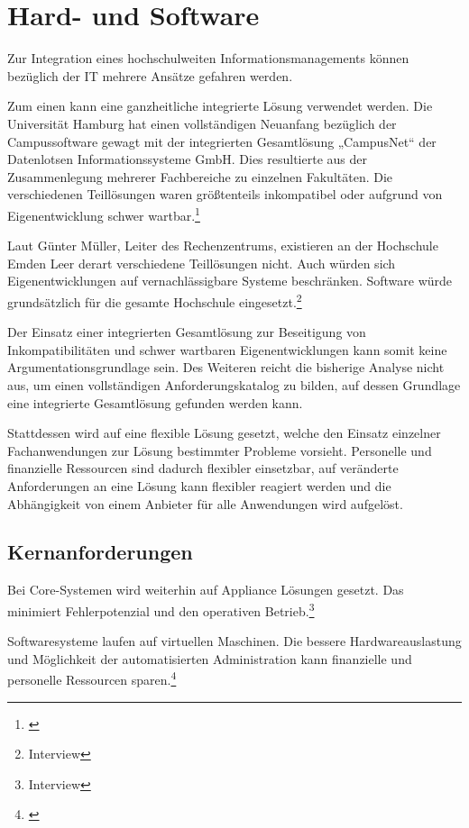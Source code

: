 \section{Hard- und Software}
Zur Integration eines hochschulweiten Informationsmanagements können bezüglich der IT mehrere Ansätze gefahren werden.

Zum einen kann eine ganzheitliche integrierte Lösung verwendet werden. Die Universität Hamburg hat einen vollständigen Neuanfang bezüglich der Campussoftware gewagt mit der integrierten Gesamtlösung „CampusNet“ der Datenlotsen Informationssysteme GmbH. Dies resultierte aus der Zusammenlegung mehrerer Fachbereiche zu einzelnen Fakultäten. Die verschiedenen Teillösungen waren größtenteils inkompatibel oder aufgrund von Eigenentwicklung schwer wartbar.\footnote{\cite{dini_webportale_2007}}

Laut Günter Müller, Leiter des Rechenzentrums, existieren an der Hochschule Emden Leer derart verschiedene Teillösungen nicht. Auch würden sich Eigenentwicklungen auf vernachlässigbare Systeme beschränken. Software würde grundsätzlich für die gesamte Hochschule eingesetzt.\footnote{Interview}

Der Einsatz einer integrierten Gesamtlösung zur Beseitigung von Inkompatibilitäten und schwer wartbaren Eigenentwicklungen kann somit keine Argumentationsgrundlage sein.
Des Weiteren reicht die bisherige Analyse nicht aus, um einen vollständigen Anforderungskatalog zu bilden, auf dessen Grundlage eine integrierte Gesamtlösung gefunden werden kann.

Stattdessen wird auf eine flexible Lösung gesetzt, welche den Einsatz einzelner Fachanwendungen zur Lösung bestimmter Probleme vorsieht. Personelle und finanzielle Ressourcen sind dadurch flexibler einsetzbar, auf veränderte Anforderungen an eine Lösung kann flexibler reagiert werden und die Abhängigkeit von einem Anbieter für alle Anwendungen wird aufgelöst.

\subsection{Kernanforderungen}
Bei Core-Systemen wird weiterhin auf Appliance Lösungen gesetzt. Das minimiert Fehlerpotenzial und den operativen Betrieb.\footnote{Interview}

Softwaresysteme laufen auf virtuellen Maschinen. Die bessere Hardwareauslastung und Möglichkeit der automatisierten Administration kann finanzielle und personelle Ressourcen sparen.\footnote{\cite{baun_servervirtualisierung_2009}}

